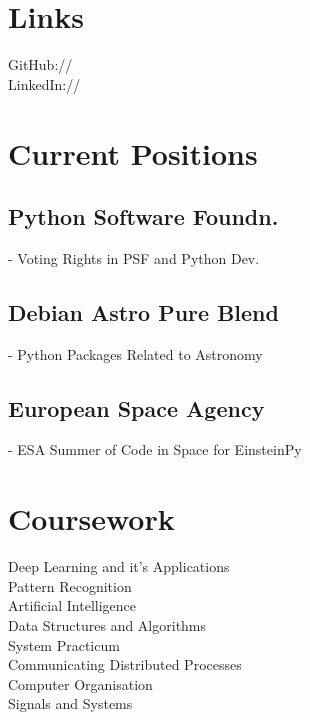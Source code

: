 \documentclass[a4paper]{deedy-resume-openfont}
\begin{document}
\begin{minipage}[t]{0.33\textwidth}



\section{Links} 
GitHub:// \href{https://github.com/shreyasbapat}{} \\
LinkedIn://  \href{https://www.linkedin.com/in/shreyasbapat}{} \\
\section{Current Positions} 

\subsection{Python Software Foundn.}
- Voting Rights in PSF and Python Dev.
\sectionsep
\subsection{Debian Astro Pure Blend}
- Python Packages Related to Astronomy
\sectionsep
\subsection{European Space Agency}
- ESA Summer of Code in Space for EinsteinPy



\section{Coursework}
Deep Learning and it's Applications\\
Pattern Recognition\\
Artificial Intelligence\\
Data Structures and Algorithms\\
System Practicum\\
Communicating Distributed Processes\\
Computer Organisation\\
Signals and Systems


\end{minipage}
\end{document}
